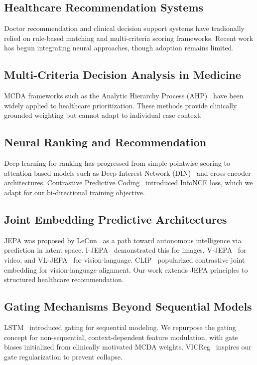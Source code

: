 \documentclass[journal]{IEEEtran}
\begin{document}
\subsection{Healthcare Recommendation Systems}
Doctor recommendation and clinical decision support systems have
tradionally relied on rule-based matching and multi-criteria
scoring frameworks. Recent work has begun integrating neural
approaches, though adoption remains limited.

\subsection{Multi-Criteria Decision Analysis in Medicine}
MCDA frameworks such as the Analytic Hierarchy Process
(AHP)~\cite{saaty1990ahp} have been widely applied to healthcare
prioritization. These methods provide clinically grounded weighting
but cannot adapt to individual case context.

\subsection{Neural Ranking and Recommendation}
Deep learning for ranking has progressed from simple pointwise
scoring to attention-based models such as Deep Interest
Network (DIN)~\cite{zhou2018din} and cross-encoder architectures.
Contrastive Predictive Coding~\cite{oord2018infonce} introduced
InfoNCE loss, which we adapt for our bi-directional training
objective.

\subsection{Joint Embedding Predictive Architectures}
JEPA was proposed by LeCun~\cite{lecun2022jepa} as a path toward
autonomous intelligence via prediction in latent space.
I-JEPA~\cite{assran2023ijepa} demonstrated this for images,
V-JEPA~\cite{bardes2024vjepa} for video, and
VL-JEPA~\cite{vljepa2024} for vision-language.
CLIP~\cite{radford2021clip} popularized contrastive joint
embedding for vision-language alignment. Our work extends JEPA
principles to structured healthcare recommendation.

\subsection{Gating Mechanisms Beyond Sequential Models}
LSTM~\cite{hochreiter1997lstm} introduced gating for sequential
modeling. We repurpose the gating concept for non-sequential,
context-dependent feature modulation, with gate biases initialized
from clinically motivated MCDA weights.
VICReg~\cite{bardes2022vicreg} inspires our gate regularization
to prevent collapse.
\end{document}
